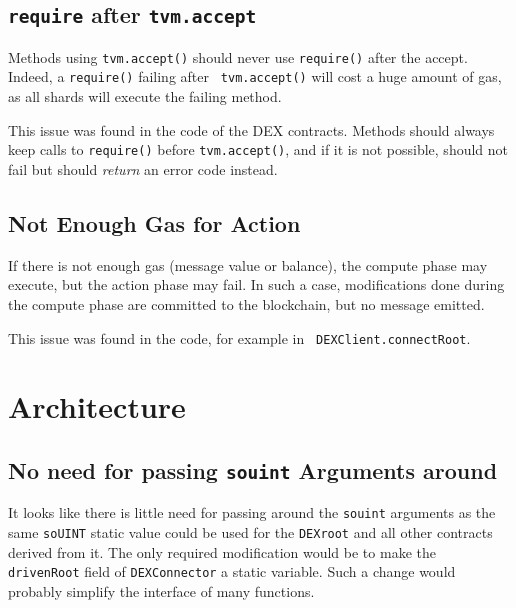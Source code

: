 \subsection{{\tt require} after {\tt tvm.accept}}
\label{accept:require}

Methods using {\tt tvm.accept()} should never use {\tt require()}
after the accept.  Indeed, a {\tt require()} failing after {\tt
  tvm.accept()} will cost a huge amount of gas, as all shards will
execute the failing method.

This issue was found in the code of the DEX contracts. Methods should
always keep calls to {\tt require()} before {\tt tvm.accept()}, and if
it is not possible, should not fail but should {\em return} an error
code instead.

\subsection{Not Enough Gas for Action}
\label{gas:partial}

If there is not enough gas (message value or balance), the compute
phase may execute, but the action phase may fail. In such a case,
modifications done during the compute phase are committed to the
blockchain, but no message emitted.

This issue was found in the code, for example in {\tt
  DEXClient.connectRoot}.

\section{Architecture}


\subsection{No need for passing {\tt souint} Arguments around}

It looks like there is little need for passing around the {\tt souint}
arguments as the same {\tt soUINT} static value could be used for the
{\tt DEXroot} and all other contracts derived from it. The only
required modification would be to make the {\tt drivenRoot} field of
{\tt DEXConnector} a static variable. Such a change would probably
simplify the interface of many functions.


